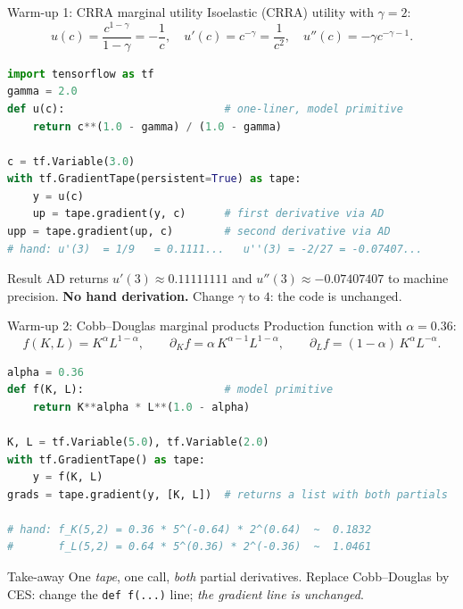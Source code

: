 \documentclass[aspectratio=169,11pt]{beamer}
\begin{document}
\begin{frame}[fragile]{Warm-up 1: CRRA marginal utility}
\footnotesize Isoelastic (CRRA) utility with $\gamma = 2$:
\[
u(c) = \frac{c^{1-\gamma}}{1-\gamma} = -\frac{1}{c}, \quad u'(c) = c^{-\gamma} = \frac{1}{c^2}, \quad u''(c) = -\gamma c^{-\gamma-1}.
\]
\begin{lstlisting}[language=Python,basicstyle=\ttfamily\scriptsize]
import tensorflow as tf
gamma = 2.0
def u(c):                         # one-liner, model primitive
    return c**(1.0 - gamma) / (1.0 - gamma)

c = tf.Variable(3.0)
with tf.GradientTape(persistent=True) as tape:
    y = u(c)
    up = tape.gradient(y, c)      # first derivative via AD
upp = tape.gradient(up, c)        # second derivative via AD
# hand: u'(3)  = 1/9   = 0.1111...   u''(3) = -2/27 = -0.07407...
\end{lstlisting}
\begin{exampleblock}{Result}
\footnotesize AD returns $u'(3) \approx 0.11111111$ and $u''(3) \approx -0.07407407$ to machine precision. \textbf{No hand derivation.} Change $\gamma$ to $4$: the code is unchanged.
\end{exampleblock}
\end{frame}

\begin{frame}[fragile]{Warm-up 2: Cobb--Douglas marginal products}
\small Production function with $\alpha = 0.36$:
\[
f(K,L) = K^\alpha L^{1-\alpha}, \qquad
\partial_K f = \alpha\,K^{\alpha-1} L^{1-\alpha}, \qquad
\partial_L f = (1-\alpha)\,K^\alpha L^{-\alpha}.
\]
\begin{lstlisting}[language=Python,basicstyle=\ttfamily\scriptsize]
alpha = 0.36
def f(K, L):                      # model primitive
    return K**alpha * L**(1.0 - alpha)

K, L = tf.Variable(5.0), tf.Variable(2.0)
with tf.GradientTape() as tape:
    y = f(K, L)
grads = tape.gradient(y, [K, L])  # returns a list with both partials

# hand: f_K(5,2) = 0.36 * 5^(-0.64) * 2^(0.64)  ~  0.1832
#       f_L(5,2) = 0.64 * 5^(0.36) * 2^(-0.36)  ~  1.0461
\end{lstlisting}
\vspace{-2pt}
\begin{exampleblock}{Take-away}
\small One \emph{tape}, one call, \emph{both} partial derivatives. Replace Cobb--Douglas by CES: change the \texttt{def f(...)} line; \emph{the gradient line is unchanged}.
\end{exampleblock}
\end{frame}
\end{document}
